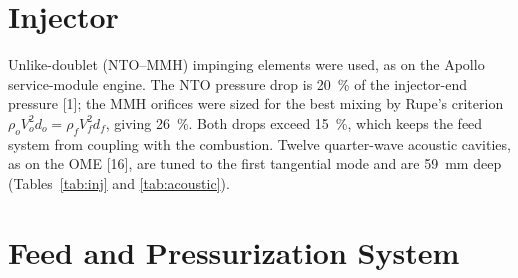 \documentclass[10pt]{article}
\newcommand{\NLcav}{59}
\newcommand{\NdPf}{26}
\begin{document}
\section{Injector}
Unlike-doublet (NTO--MMH) impinging elements were used, as on the Apollo service-module engine. The NTO pressure drop is
20~\% of the injector-end pressure [1]; the MMH orifices were sized for the best mixing by Rupe's criterion
$\rho_o V_o^2 d_o = \rho_f V_f^2 d_f$, giving \NdPf~\%. Both drops exceed 15~\%, which keeps the feed system from coupling
with the combustion. Twelve quarter-wave acoustic cavities, as on the OME [16], are tuned to the first tangential mode
and are \NLcav~mm deep (Tables~\ref{tab:inj} and \ref{tab:acoustic}).
\begin{table}[H]\centering\small\caption{Injector design.}\label{tab:inj}\end{table}
\begin{table}[H]\centering\small\caption{Acoustic modes and cavities.}\label{tab:acoustic}\end{table}

\section{Feed and Pressurization System}
\end{document}
